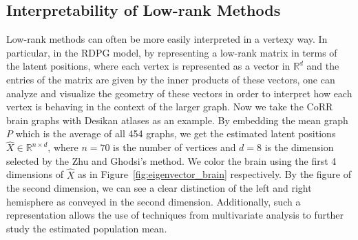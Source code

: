 \subsection{Interpretability of Low-rank Methods}
\label{sec:interpretability}

Low-rank methods can often be more easily interpreted in a vertexy way.
In particular, in the RDPG model, by representing a low-rank matrix in terms of the latent positions, where each vertex is represented as a vector in $\mathbb{R}^d$ and the entries of the matrix are given by the inner products of these vectors, one can analyze and visualize the geometry of these vectors in order to interpret how each vertex is behaving in the context of the larger graph. 
Now we take the CoRR brain graphs with Desikan atlases as an example. By embedding the mean graph $P$ which is the average of all 454 graphs, we get the estimated latent positions $\hat{X} \in \mathbb{R}^{n \times d}$, where $n=70$ is the number of vertices and $d = 8$ is the dimension selected by the Zhu and Ghodsi's method.
We color the brain using the first 4 dimensions of $\hat{X}$ as in Figure~\ref{fig:eigenvector_brain} respectively. By the figure of the second dimension, we can see a clear distinction of the left and right hemisphere as conveyed in the second dimension. Additionally, such a representation allows the use of techniques from multivariate analysis to further study the estimated population mean.

